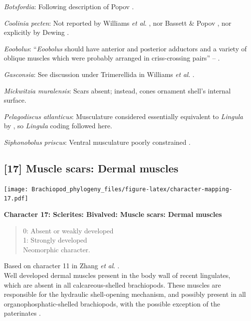 \documentclass[openany]{book}
\theoremstyle{definition}
\theoremstyle{definition}
\theoremstyle{definition}
\theoremstyle{remark}
\begin{document}
\hypertarget{Botsfordia-coding-16}{}
\emph{Botsfordia}: Following description of Popov
\citeyearpar{Popov1992TheCambrian}.

\hypertarget{Coolinia_pecten-coding-16}{}
\emph{Coolinia pecten}: Not reported by Williams \emph{et al}.
\citeyearpar{Williams2000LinguliformeaCraniiformea}, nor Bassett \&
Popov \citeyearpar{Bassett2017Earliestontogeny}, nor explicitly by
Dewing \citeyearpar{Dewing2001Hingemodifications}.

\hypertarget{Eoobolus-coding-16}{}
\emph{Eoobolus}: ``\emph{Eoobolus} should have anterior and posterior
adductors and a variety of oblique muscles which were probably arranged
in criss-crossing pairs'' -- \citet{Balthasar2009Thebrachiopod}.

\hypertarget{Gasconsia-coding-16}{}
\emph{Gasconsia}: See discussion under Trimerellida in Williams \emph{et
al}. \citeyearpar{Williams2000LinguliformeaCraniiformea}.

\hypertarget{Mickwitzia_muralensis-coding-16}{}
\emph{Mickwitzia muralensis}: Scars absent; instead, cones ornament
shell's internal surface.

\hypertarget{Pelagodiscus_atlanticus-coding-16}{}
\emph{Pelagodiscus atlanticus}: Musculature considered essentially
equivalent to \emph{Lingula} by
\citet{Williams2000LinguliformeaCraniiformea}, so \emph{Lingula} coding
followed here.

\hypertarget{Siphonobolus_priscus-coding-16}{}
\emph{Siphonobolus priscus}: Ventral musculature poorly constrained
\citep{Williams2000LinguliformeaCraniiformea, Popov2009Earlyontogeny}.

\subsection*{{[}17{]} Muscle scars: Dermal
muscles}\label{muscle-scars-dermal-muscles}

\texttt{[image: Brachiopod\_phylogeny\_files/figure-latex/character-mapping-17.pdf]}

\textbf{Character 17: Sclerites: Bivalved: Muscle scars: Dermal muscles}

\begin{quote}
0: Absent or weakly developed\\
1: Strongly developed\\
Neomorphic character.
\end{quote}

Based on character 11 in Zhang \emph{et al}.
\citeyearpar{Zhang2014Anearly}.\\
Well developed dermal muscles present in the body wall of recent
lingulates, which are absent in all calcareous-shelled brachiopods.
These muscles are responsible for the hydraulic shell-opening mechanism,
and possibly present in all organophosphatic-shelled brachiopods, with
the possible exception of the paterinates
\citep[p.~32]{Williams2000LinguliformeaCraniiformea}.
\end{document}
